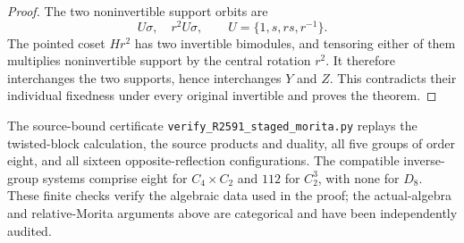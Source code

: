 \begin{proof}
The two noninvertible support orbits are
\[
 U\sigma,\quad r^2U\sigma,
 \qquad U=\{1,s,rs,r^{-1}\}.
\]
The pointed coset $Hr^2$ has two invertible bimodules, and tensoring
either of them multiplies noninvertible support by the central
rotation $r^2$.  It therefore interchanges the two supports, hence
interchanges $Y$ and $Z$.  This contradicts their individual
fixedness under every original invertible and proves the theorem.
\end{proof}

\begin{remark}
The source-bound certificate
\texttt{verify\_R2591\_staged\_morita.py} replays the twisted-block
calculation, the source products and duality, all five groups of
order eight, and all sixteen opposite-reflection configurations.
The compatible inverse-group systems comprise eight for
$C_4\times C_2$ and $112$ for $C_2^3$, with none for $D_8$.
These finite checks verify the algebraic data used in the proof;
the actual-algebra and relative-Morita arguments above are
categorical and have been independently audited.
\end{remark}
